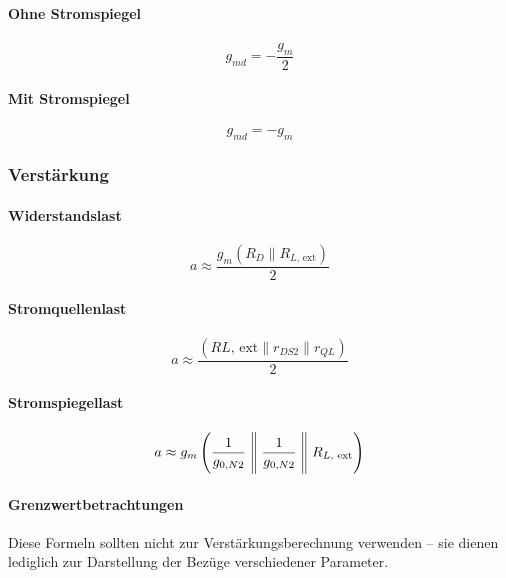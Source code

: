 \paragraph{Ohne Stromspiegel}
\[
    g_{md} = -\frac{g_m}{2}
\]

\paragraph{Mit Stromspiegel}
\[
    g_{md} = -g_m
\]


\subsubsection{Verstärkung}

\paragraph{Widerstandslast}

\[
    a \approx \frac{g_m (R_D \parallel R_{L\text{, ext}})}{2}
\]

\paragraph{Stromquellenlast}

\[
    a \approx \frac{ (R{L\text{, ext}} \parallel r_{DS2} \parallel r_{QL})}{2}
\]

\paragraph{Stromspiegellast}

\[
    a \approx g_m \left(\frac{1}{g_{0, N2}} \Biggm\Vert \frac{1}{g_{0, N2}} \Biggm\Vert R_{L\text{, ext}}\right)
\]

\paragraph{Grenzwertbetrachtungen}
\medskip%

Diese Formeln sollten nicht zur Verstärkungsberechnung verwenden -- sie dienen lediglich zur Darstellung der Bezüge verschiedener Parameter.


